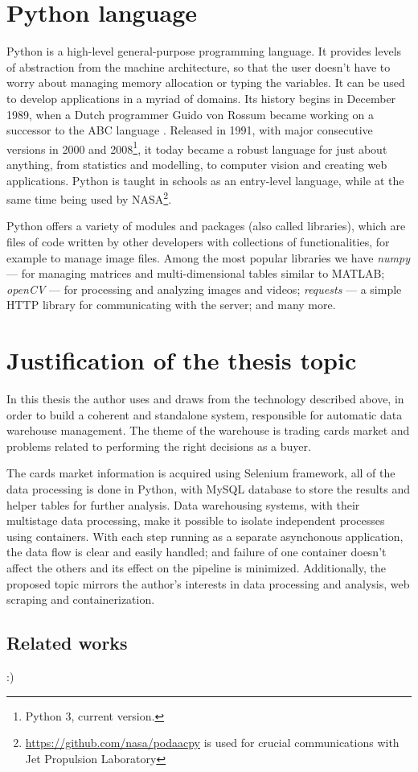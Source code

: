 \section{Python language}
Python is a high-level general-purpose programming language. It provides levels of abstraction from the machine architecture, so that the user doesn't have to worry about managing memory allocation or typing the variables. It can be used to develop applications in a myriad of domains. Its history begins in December 1989, when a Dutch programmer Guido von Rossum became working on a successor to the ABC language \cite{thePython}. Released in 1991, with major consecutive versions in 2000 and 2008\footnote{Python 3, current version.}, it today became a robust language for just about anything, from statistics and modelling, to computer vision and creating web applications. Python is taught in schools as an entry-level language, while at the same time being used by NASA\footnote{\url{https://github.com/nasa/podaacpy} is used for crucial communications with Jet Propulsion Laboratory}. \par
Python offers a variety of modules and packages (also called libraries), which are files of code written by other developers with collections of functionalities, for example to manage image files. Among the most popular libraries we have \textit{numpy} --- for managing matrices and multi-dimensional tables similar to MATLAB; \textit{openCV} --- for processing and analyzing images and videos; \textit{requests} --- a simple HTTP library for communicating with the server; and many more. \par


\section{Justification of the thesis topic}
In this thesis the author uses and draws from the technology described above, in order to build a coherent and standalone system, responsible for automatic data warehouse management. The theme of the warehouse is trading cards market and problems related to performing the right decisions as a buyer. \par
The cards market information is acquired using Selenium framework, all of the data processing is done in Python, with MySQL database to store the results and helper tables for further analysis. Data warehousing systems, with their multistage data processing, make it possible to isolate independent processes using containers. With each step running as a separate asynchonous application, the data flow is clear and easily handled; and failure of one container doesn't affect the others and its effect on the pipeline is minimized. Additionally, the proposed topic mirrors the author's interests in data processing and analysis, web scraping and containerization.

\subsection{Related works}
:)
